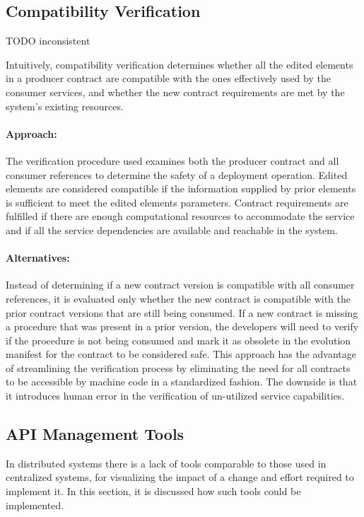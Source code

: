 \subsection{Compatibility Verification} %
\label{sec:compatibility_verification_design}

TODO inconsistent

Intuitively, compatibility verification determines whether
all the edited elements in a producer contract are compatible with the ones effectively
used by the consumer services, and whether the new contract requirements are met
by the system’s existing resources.

\paragraph{Approach:}
The verification procedure used examines both the producer contract and all consumer references to determine the safety of a deployment operation.
Edited elements are considered compatible if the information supplied by prior elements is sufficient to meet the edited elements parameters.
Contract requirements are fulfilled if there are enough computational resources to accommodate the service and if all the
service dependencies are available and reachable in the system.

\paragraph{Alternatives:}
Instead of determining if a new contract version is compatible with all consumer references,
it is evaluated only whether the new contract is compatible with the prior contract versions that are still being consumed.
If a new contract is missing a procedure that was present in a prior version,
the developers will need to verify if the procedure is not being consumed
and mark it as obsolete in the evolution manifest for the contract to be considered safe.
This approach has the advantage of streamlining the verification process by eliminating the
need for all contracts to be accessible by machine code in a standardized fashion.
The downside is that it introduces human error in the verification of un-utilized service capabilities.

\subsection{API Management Tools} %
\label{sec:tools}

In distributed systems there is a lack of tools
comparable to those used in centralized systems, for visualizing the impact of a change and effort required to implement it.
In this section, it is discussed how such tools could be implemented.

